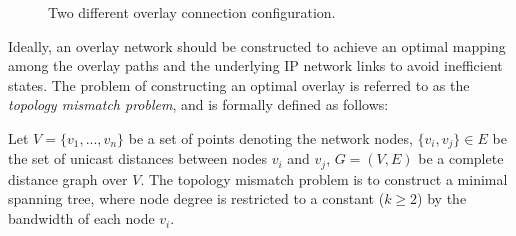 \begin{figure}[ht]
\centering
{}\qquad\qquad
{}
\caption{Two different overlay connection configuration.}
\label{figure:overlay-confs}
\end{figure}

Ideally, an overlay network should be constructed to achieve an optimal 
mapping among the overlay paths and the underlying IP network links to avoid
inefficient states. The problem of constructing an optimal overlay is referred
to as the \emph{topology mismatch problem}, and is formally defined as follows:
\begin{definition}
Let $V = \{v_1, ..., v_n\}$ be a set of points denoting the network nodes,
$\{v_i, v_j\} \in E$ be the set of unicast distances between nodes $v_i$ and
$v_j$, $G=(V,E)$ be a complete distance graph over $V$. The topology mismatch
problem is to construct a minimal spanning tree, where node degree is
restricted to a constant ($k\geq 2$) by the bandwidth of each node $v_i$.
\end{definition}


